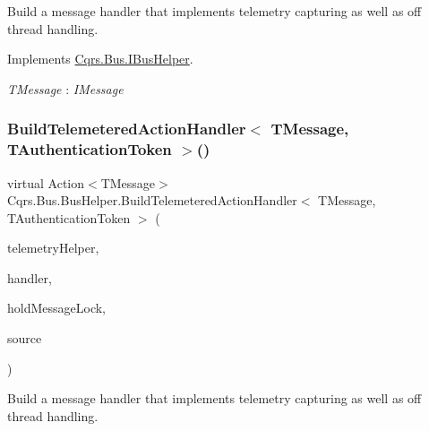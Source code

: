 Build a message handler that implements telemetry capturing as well as off thread handling. 



Implements \hyperlink{interfaceCqrs_1_1Bus_1_1IBusHelper_ac69a1e4722e2839c2c180b9a06a8646c_ac69a1e4722e2839c2c180b9a06a8646c}{Cqrs.\+Bus.\+I\+Bus\+Helper}.

\begin{Desc}
\item[Type Constraints]\begin{description}
\item[{\em T\+Message} : {\em I\+Message}]\end{description}
\end{Desc}
\mbox{\label{classCqrs_1_1Bus_1_1BusHelper_a7edd5b2ac0d46ce225e592f857f6d525_a7edd5b2ac0d46ce225e592f857f6d525}} 
\subsubsection{\texorpdfstring{Build\+Telemetered\+Action\+Handler$<$ T\+Message, T\+Authentication\+Token $>$()}{BuildTelemeteredActionHandler< TMessage, TAuthenticationToken >()}}
{\footnotesize\ttfamily virtual Action$<$T\+Message$>$ Cqrs.\+Bus.\+Bus\+Helper.\+Build\+Telemetered\+Action\+Handler$<$ T\+Message, T\+Authentication\+Token $>$ (\begin{DoxyParamCaption}\item[{I\+Telemetry\+Helper}]{telemetry\+Helper,  }\item[{Action$<$ T\+Message $>$}]{handler,  }\item[{bool}]{hold\+Message\+Lock,  }\item[{string}]{source }\end{DoxyParamCaption})\hspace{0.3cm}{\ttfamily [virtual]}}



Build a message handler that implements telemetry capturing as well as off thread handling. 



